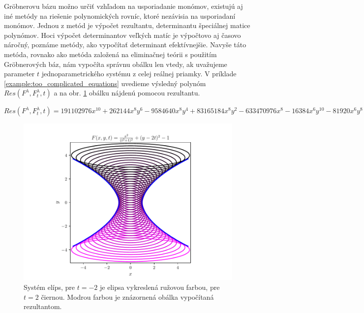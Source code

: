 Gröbnerovu bázu možno určiť vzhľadom na usporiadanie monómov, existujú aj iné metódy na riešenie polynomických rovníc, ktoré nezávisia na usporiadaní monómov. Jednou z metód je výpočet rezultantu, determinantu špeciálnej matice polynómov.
Hoci výpočet determinantov veľkých matíc je výpočtovo aj časovo náročný, poznáme metódy, ako vypočítať determinant efektívnejšie. Navyše táto metóda, rovnako ako metóda založená na eliminačnej teórii s použitím Gröbnerových báz, nám vypočíta správnu obálku len vtedy, ak uvažujeme parameter $t$ jednoparametrického systému z celej reálnej priamky. 
V príklade \ref{example:too_complicated_equations} uvedieme výsledný polynóm $Res(F^\lambda , F_t^\lambda , t)$ a na obr. \ref{fig:too_complicated_equations} obálku nájdenú pomocou rezultantu. 

$ Res(F^\lambda , F_t^\lambda , t) = 191102976x^{10} + 262144x^8y^6 - 9584640x^8y^4 + 83165184x^8y^2 - 633470976x^8 - 16384x^6y^{10} - 81920x^6y^8 - 14483456x^6y^6 - 113311744x^6y^4 + 96419840x^6y^2 + 698368000x^6 - 16384x^4y^{12} - 294912x^4y^{10} - 2998272x^4y^8 - 18284544x^4y^6 - 74956800x^4y^4 - 184320000x^4y^2 - 256000000x^4. $
\begin{figure}[h]
	\centering
	\includegraphics{images/resultant.pdf}
	\caption[Obálka nájdená pomocou rezultantu.]{Systém elíps, pre $t=-2$ je elipsa vykreslená ružovou farbou, pre $t=2$ čiernou. Modrou farbou je znázornená obálka vypočítaná rezultantom.}
	\label{fig:too_complicated_equations}
\end{figure}

